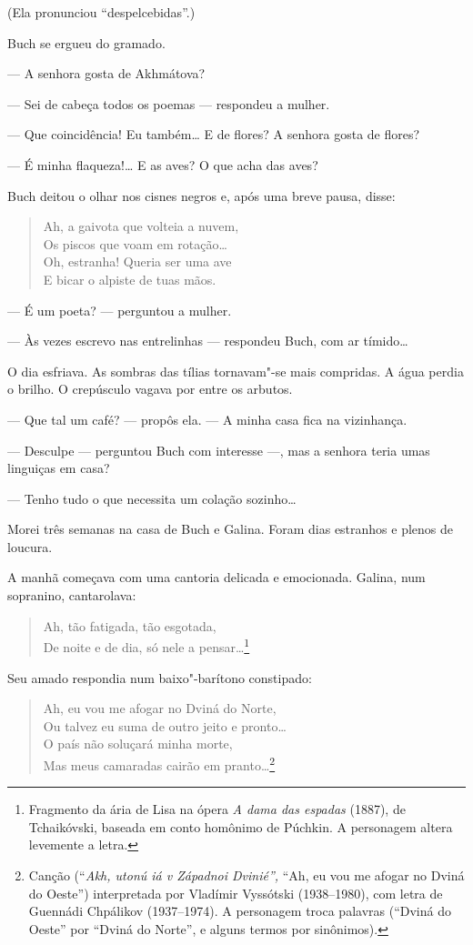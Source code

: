 (Ela pronunciou ``despelcebidas''.)

Buch se ergueu do gramado.

--- A senhora gosta de Akhmátova?

--- Sei de cabeça todos os poemas --- respondeu a mulher.

--- Que coincidência! Eu também\ldots{} E de flores? A senhora gosta de
flores?

--- É minha flaqueza!\ldots{} E as aves? O que acha das aves?

Buch deitou o olhar nos cisnes negros e, após uma breve pausa, disse:

\begin{verse}
Ah, a gaivota que volteia a nuvem,\\
Os piscos que voam em rotação\ldots{}\\
Oh, estranha! Queria ser uma ave\\
E bicar o alpiste de tuas mãos.
\end{verse}

--- É um poeta? --- perguntou a mulher.

--- Às vezes escrevo nas entrelinhas --- respondeu Buch, com ar
tímido\ldots{}

O dia esfriava. As sombras das tílias tornavam"-se mais compridas. A água perdia o brilho. O crepúsculo vagava por entre os arbutos.

--- Que tal um café? --- propôs ela. --- A minha casa fica na
vizinhança.

--- Desculpe --- perguntou Buch com interesse ---, mas a senhora teria
umas linguiças em casa?

--- Tenho tudo o que necessita um colação sozinho\ldots{}

Morei três semanas na casa de Buch e Galina. Foram dias estranhos e
plenos de loucura.

A manhã começava com uma cantoria delicada e emocionada. Galina, num
sopranino, cantarolava:

\begin{verse}
Ah, tão fatigada, tão esgotada,\\
De noite e de dia, só nele a pensar\ldots{}\footnote{Fragmento da ária de
  Lisa na ópera \emph{A dama das espadas} (1887), de Tchaikóvski,
  baseada em conto homônimo de Púchkin. A personagem altera levemente a
  letra.}
\end{verse}

Seu amado respondia num baixo"-barítono constipado:

\begin{verse}
Ah, eu vou me afogar no Dviná do Norte,\\
Ou talvez eu suma de outro jeito e pronto\ldots{}\\
O país não soluçará minha morte,\\
Mas meus camaradas cairão em pranto\ldots{}\footnote{Canção (``\emph{Akh,
  utonú iá v Západnoi Dvinié'',} ``Ah, eu vou me afogar no Dviná do
  Oeste'') interpretada por Vladímir Vyssótski (1938--1980), com letra
  de Guennádi Chpálikov (1937--1974). A personagem troca palavras
  (``Dviná do Oeste'' por ``Dviná do Norte'', e alguns termos por
  sinônimos).}
\end{verse}

